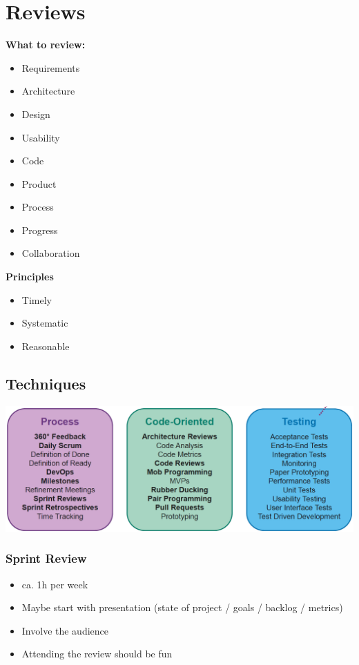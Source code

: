 
\section{Reviews}
\textbf{What to review:}
\begin{itemize}
    \item Requirements
    \item Architecture
    \item Design
    \item Usability
    \item Code
    \item Product
    \item Process
    \item Progress
    \item Collaboration
\end{itemize}
\textbf{Principles}
\begin{itemize}
    \item Timely
    \item Systematic
    \item Reasonable
\end{itemize}

\subsection{Techniques}
\includegraphics[width=\linewidth]{../img/review_techniques.png}

\subsubsection{Sprint Review}
\begin{itemize}
    \item ca. 1h per week
    \item Maybe start with presentation (state of project / goals / backlog / metrics)
    \item Involve the audience
    \item Attending the review should be fun
\end{itemize}

